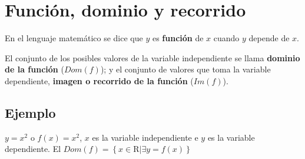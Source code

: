 %
%
%
%
%
%
%
%
%
%
%
%


\section{Función, dominio y recorrido}

En el lenguaje matemático se dice que $y$ es \textbf{función} de $x$ cuando $y$ depende de $x$.

El conjunto de los posibles valores de la
variable independiente se llama \textbf{dominio de la función} ($Dom(f)$); y el conjunto de valores que toma la variable dependiente, \textbf{imagen o recorrido de la función} ($Im(f)$).

\subsection{Ejemplo}
$y=x^2$ o $f(x)=x^2$, $x$ es la variable independiente e $y$ es la variable dependiente. El $Dom(f)=\left\lbrace x \in \mathrm{R} | \exists y=f(x)\right\rbrace$ 	







%
%
